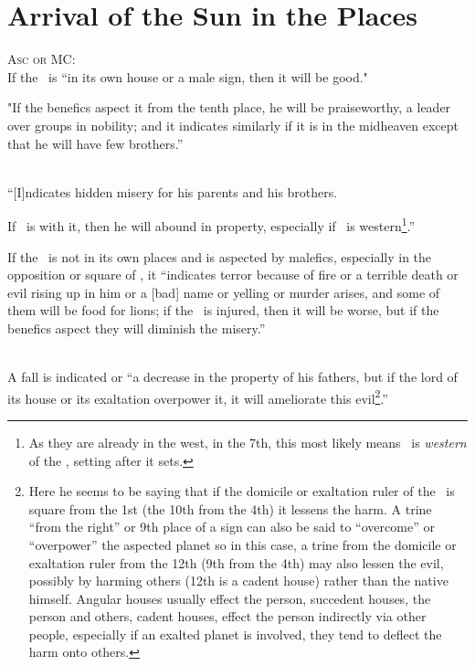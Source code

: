 \section{Arrival of the Sun in the Places}
\textsc{Asc or MC:} \\
\indent If the \Sun\, is ``in its own house or a male sign, then it will be good." 

"If the benefics aspect it from the tenth place, he will be praiseworthy, a leader over groups in nobility; and it indicates similarly if it is in the midheaven except that he will have few brothers.''

\\
\indent ``[I]ndicates hidden misery for his parents and his brothers.

If \Mercury\, is with it, then he will abound in property, especially if \Mercury\, is western\footnote{As they are already in the west, in the 7th, this most likely means \Mercury\, is \textsl{western} of the \Sun, setting after it sets.}.''

If the \Sun\, is not in its own places and is aspected by malefics, especially in the opposition or square of \Mars, it ``indicates terror because of fire or a terrible death or evil rising up in him or a [bad] name or yelling or murder arises, and some of them will be food for lions; if the \Moon\, is injured, then it will be worse, but if the benefics aspect they will diminish the misery.''

 \\
\indent A fall is indicated or ``a decrease in the property of his fathers, but if the lord of its house or its exaltation overpower it, it will ameliorate this evil\footnote{Here he seems to be saying that if the domicile or exaltation ruler of the \Sun\, is square from the 1st (the 10th from the 4th) it lessens the harm. A trine ``from the right'' or 9th place of a sign can also be said to ``overcome'' or ``overpower'' the aspected planet so in this case, a trine from the domicile or exaltation ruler from the 12th (9th from the 4th) may also lessen the evil, possibly by harming others (12th is a cadent house) rather than the native himself. Angular houses usually effect the person, succedent houses, the person and others, cadent houses, effect the person indirectly via other people, especially if an exalted planet is involved, they tend to deflect the harm onto others.}.''
